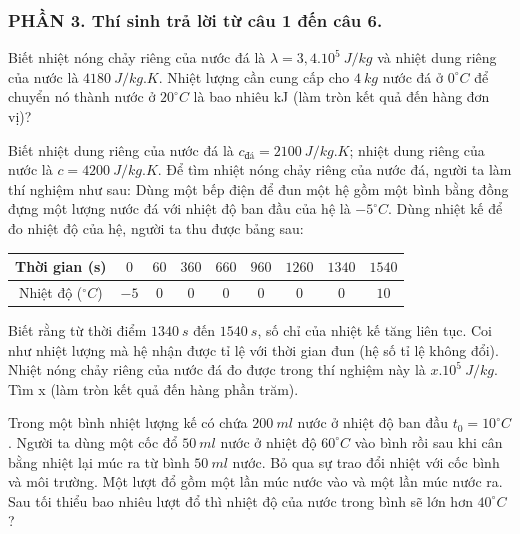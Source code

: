 \subsubsection*{PHẦN 3. Thí sinh trả lời từ câu 1 đến câu 6.}
\setcounter{ex}{0}
\begin{ex}
Biết nhiệt nóng chảy riêng của nước đá là $\lambda = 3,4.10^5\ J/kg$ và nhiệt dung riêng của nước là $4180\ J/kg.K$. Nhiệt lượng cần cung cấp cho $4\ kg$ nước đá ở $0^\circ C$ để chuyển nó thành nước ở $20^\circ C$ là bao nhiêu kJ (làm tròn kết quả đến hàng đơn vị)?
\loigiai{}
\end{ex}
\begin{ex}
Biết nhiệt dung riêng của nước đá là $c_{\text{đá}} = 2100\ J/kg.K$; nhiệt dung riêng của nước là $c = 4200\ J/kg.K$. Để tìm nhiệt nóng chảy riêng của nước đá, người ta làm thí nghiệm như sau: Dùng một bếp điện để đun một hệ gồm một bình bằng đồng đựng một lượng nước đá với nhiệt độ ban đầu của hệ là $-5^\circ C$. Dùng nhiệt kế để đo nhiệt độ của hệ, người ta thu được bảng sau:
\begin{center}
\begin{tabular}{|c|c|c|c|c|c|c|c|c|}
\hline
Thời gian (s) & $0$ & $60$ & $360$ & $660$ & $960$ & $1260$ & $1340$ & $1540$ \\
\hline
Nhiệt độ ($^\circ C$) & $-5$ & $0$ & $0$ & $0$ & $0$ & $0$ & $0$ & $10$ \\
\hline
\end{tabular}
\end{center}
Biết rằng từ thời điểm $1340\ s$ đến $1540\ s$, số chỉ của nhiệt kế tăng liên tục. Coi như nhiệt lượng mà hệ nhận được tỉ lệ với thời gian đun (hệ số tỉ lệ không đổi). Nhiệt nóng chảy riêng của nước đá đo được trong thí nghiệm này là $x.10^5\ J/kg$. Tìm x (làm tròn kết quả đến hàng phần trăm).
\loigiai{}
\end{ex}
\begin{ex}
Trong một bình nhiệt lượng kế có chứa $200\ ml$ nước ở nhiệt độ ban đầu $t_0 = 10^\circ C$. Người ta dùng một cốc đổ $50\ ml$ nước ở nhiệt độ $60^\circ C$ vào bình rồi sau khi cân bằng nhiệt lại múc ra từ bình $50\ ml$ nước. Bỏ qua sự trao đổi nhiệt với cốc bình và môi trường.  Một lượt đổ gồm một lần múc nước vào và một lần múc nước ra. Sau tối thiểu bao nhiêu lượt đổ thì nhiệt độ của nước trong bình sẽ lớn hơn $40^\circ C$? 
\loigiai{}
\end{ex}
